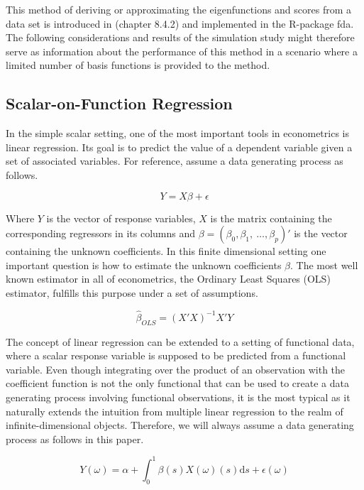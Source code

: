 \documentclass[11pt,twoside,a4paper]{article}
\begin{document}
	This method of deriving or approximating the eigenfunctions and scores from a data set is introduced in \cite{ramsay_functional_2005} (chapter 8.4.2) and implemented in the R-package fda. The following considerations and results of the simulation study might therefore serve as information about the performance of this method in a scenario where a limited number of basis functions is provided to the method.
	
	\subsection{Scalar-on-Function Regression}
	In the simple scalar setting, one of the most important tools in econometrics is linear regression. Its goal is to predict the value of a dependent variable given a set of associated variables. For reference, assume a data generating process as follows.
	
	\begin{equation}
		Y = X\beta + \epsilon
	\end{equation}
	
	Where $Y$ is the vector of response variables, $X$ is the matrix containing the corresponding regressors in its columns and $\beta = (\beta_0, \beta_1, \: \dots, \beta_p)'$ is the vector containing the unknown coefficients.
	In this finite dimensional setting one important question is how to estimate the unknown coefficients $\beta$. The most well known estimator in all of econometrics, the Ordinary Least Squares (OLS) estimator, fulfills this purpose under a set of assumptions.
	
	\begin{equation}
		\hat{\beta}_{OLS} = (X'X)^{-1}X'Y
	\end{equation}
	
	The concept of linear regression can be extended to a setting of functional data, where a scalar response variable is supposed to be predicted from a functional variable. 
	Even though integrating over the product of an observation with the coefficient function is not the only functional that can be used to create a data generating process involving functional observations, it is the most typical as it naturally extends the intuition from multiple linear regression to the realm of infinite-dimensional objects. Therefore, we will always assume a data generating process as follows in this paper.
	
	\begin{equation}\label{DGP}
		Y(\omega) = \alpha + \int_{0}^{1} \beta(s)X(\omega)(s) \mathrm{d}s + \epsilon(\omega)
	\end{equation}
	
\end{document}
